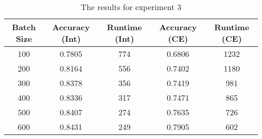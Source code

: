\begin{center}
\begin{table}[H]
\centering
\begin{tabular}{|c|c|c|c|c|}
  \hline
Batch Size & Accuracy (Int) & Runtime (Int) & Accuracy (CE) & Runtime (CE) \\ 
  \hline
100 & 0.7805 & 774 & 0.6806 & 1232 \\ 
   \hline
200 & 0.8164 & 556 & 0.7402 & 1180 \\ 
   \hline
300 & 0.8378 & 356 & 0.7419 & 981 \\ 
   \hline
400 & 0.8336 & 317 & 0.7471 & 865 \\ 
   \hline
500 & 0.8407 & 274 & 0.7635 & 726 \\ 
   \hline
600 & 0.8431 & 249 & 0.7905 & 602 \\ 
   \hline
\end{tabular}
\caption{The results for experiment 3} 
\end{table}

\end{center}
